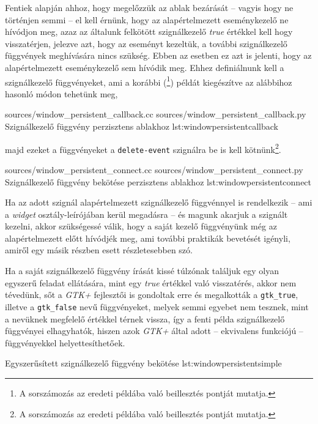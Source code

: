 Fentiek alapján ahhoz, hogy megelőzzük az ablak bezárását -- vagyis hogy ne történjen semmi -- el kell érnünk, hogy az alapértelmezett eseménykezelő ne hívódjon meg, azaz az általunk felkötött szignálkezelő \textit{true} értékkel kell hogy visszatérjen, jelezve azt, hogy az eseményt kezeltük, a további szignálkezelő függvények meghívására nincs szükség. Ebben az esetben ez azt is jelenti, hogy az alapértelmezett eseménykezelő sem hívódik meg. Ehhez definiálnunk kell a szignálkezelő  függvényeket, ami a korábbi (\footnote{A sorszámozás az eredeti példába való beillesztés pontját mutatja.}) példát kiegészítve az alábbihoz hasonló módon tehetünk meg,

{sources/window_persistent_callback.cc}
{sources/window_persistent_callback.py}
{Szignálkezelő függvény perzisztens ablakhoz}
{lst:windowpersistentcallback}

majd ezeket a függvényeket a \texttt{delete-event} szignálra be is kell kötnünk\footnote{A sorszámozás az eredeti példába való beillesztés pontját mutatja.}.

{sources/window_persistent_connect.cc}
{sources/window_persistent_connect.py}
{Szignálkezelő függvény bekötése perzisztens ablakhoz}
{lst:windowpersistentconnect}

Ha az adott szignál alapértelmezett szignálkezelő függvénnyel is rendelkezik -- ami a \textit{widget} osztály-leírójában kerül megadásra -- és magunk akarjuk a szignált kezelni, akkor szükségessé válik, hogy a saját kezelő függvényünk még az alapértelmezett előtt hívódjék meg, ami további praktikák bevetését igényli, amiről egy másik részben esett részletesebben szó.

Ha a saját szignálkezelő függvény írását kissé túlzónak találjuk egy olyan egyszerű feladat ellátására, mint egy \textit{true} értékkel való visszatérés, akkor nem tévedünk, sőt a \textit{GTK+} fejlesztői is gondoltak erre és megalkották a \texttt{gtk\_true}, illetve a \texttt{gtk\_false} nevű függvényeket, melyek semmi egyebet nem tesznek, mint a nevüknek megfelelő értékkel térnek vissza, így a fenti példa szignálkezelő függvényei elhagyhatók, hiszen azok \textit{GTK+} által adott -- ekvivalens funkciójú -- függvényekkel helyettesíthetőek.

{Egyszerűsített szignálkezelő függvény bekötése}
{lst:windowpersistentsimple}


